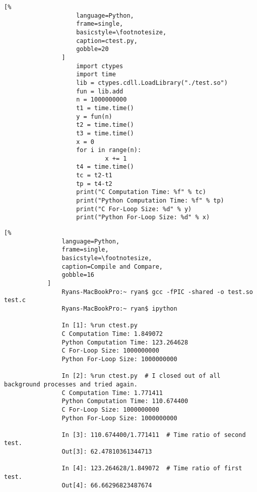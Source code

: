 \documentclass[crop=false,class=article,oneside]{standalone}
\begin{document}
            \begin{minipage}[t]{.48\textwidth}
                \centering
                \begin{lstlisting}[%
                    language=Python,
                    frame=single,
                    basicstyle=\footnotesize,
                    caption=ctest.py,
                    gobble=20
                ]
                    import ctypes
                    import time
                    lib = ctypes.cdll.LoadLibrary("./test.so")
                    fun = lib.add
                    n = 1000000000
                    t1 = time.time()
                    y = fun(n)
                    t2 = time.time()
                    t3 = time.time()
                    x = 0
                    for i in range(n):
                            x += 1
                    t4 = time.time()
                    tc = t2-t1
                    tp = t4-t2
                    print("C Computation Time: %f" % tc)
                    print("Python Computation Time: %f" % tp)
                    print("C For-Loop Size: %d" % y)
                    print("Python For-Loop Size: %d" % x)
                \end{lstlisting}
            \end{minipage}
            \begin{lstlisting}[%
                language=Python,
                frame=single,
                basicstyle=\footnotesize,
                caption=Compile and Compare,
                gobble=16
            ]
                Ryans-MacBookPro:~ ryan$ gcc -fPIC -shared -o test.so test.c
                Ryans-MacBookPro:~ ryan$ ipython
                
                In [1]: %run ctest.py
                C Computation Time: 1.849072
                Python Computation Time: 123.264628
                C For-Loop Size: 1000000000
                Python For-Loop Size: 1000000000
                
                In [2]: %run ctest.py  # I closed out of all background processes and tried again.
                C Computation Time: 1.771411
                Python Computation Time: 110.674400
                C For-Loop Size: 1000000000
                Python For-Loop Size: 1000000000
                
                In [3]: 110.674400/1.771411  # Time ratio of second test.
                Out[3]: 62.47810361344713
                
                In [4]: 123.264628/1.849072  # Time ratio of first test.
                Out[4]: 66.66296823487674
            \end{lstlisting}
\end{document}
